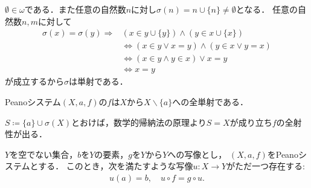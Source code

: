 	\begin{prf}
		$\emptyset \in \omega$である．また任意の自然数$n$に対し$\sigma(n) = n \cup \{n\} \neq \emptyset$となる．
		任意の自然数$n,m$に対して
		\begin{align}
			\sigma(x)=\sigma(y) \Longrightarrow &(x \in y \cup \{y\}) \wedge (y \in x \cup \{x\}) \\
					&\Longleftrightarrow \left( x \in y \vee x=y \right) \wedge 
						\left( y \in x \vee y=x \right) \\
					&\Longleftrightarrow  \left( x \in y \wedge y \in x \right) \vee x = y \\
					&\Longleftrightarrow x = y
		\end{align}
		が成立するから$\sigma$は単射である．
	\end{prf}
	
	\begin{screen}
		\begin{thm}[Peanoシステムの写像は全単射]\label{thm:successor_mapping_is_injective}
			Peanoシステム$(X,a,f)$の$f$は$X$から$X \backslash \{a\}$への全単射である．
		\end{thm}
	\end{screen}
	
	\begin{prf}
		$S \coloneqq \{a\} \cup \sigma(X)$とおけば，数学的帰納法の原理より$S = X$が成り立ち$f$の全射性が出る．
		\QED
	\end{prf}
	
	\begin{screen}
		\begin{thm}[再帰定理]\label{thm:Peano_recursion_theorem}
			$Y$を空でない集合，$b$を$Y$の要素，$g$を$Y$から$Y$への写像とし，
			$(X,a,f)$をPeanoシステムとする．
			このとき，次を満たすような写像$u:X \longrightarrow Y$がただ一つ存在する:
			\begin{align}
				u(a) = b,\quad u \circ f = g \circ u.
				\label{eq:thm_Peano_recursion_theorem}
			\end{align}
		\end{thm}
	\end{screen}
	

